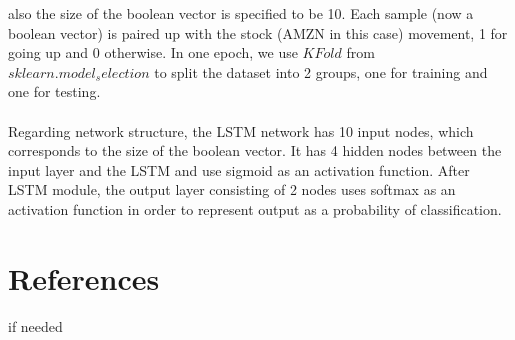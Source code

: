 \documentclass{article}
\begin{document}
 also the size of the boolean vector is specified to be 10. Each sample (now a boolean vector) is paired up with
 the stock (AMZN in this case) movement, 1 for going up and 0 otherwise. In one epoch, we use $KFold$ from
 $sklearn.model_selection$ to split the dataset into 2 groups, one for training and one for testing.
\\\\
 Regarding network structure, the LSTM network has 10 input nodes, which corresponds to the size of
 the boolean vector. It has 4 hidden nodes between the input layer and the LSTM and use sigmoid as an activation
 function. After LSTM module, the output layer consisting of 2 nodes uses softmax as an activation function in order
 to represent output as a probability of classification.
\section*{References}
if needed
\end{document}
